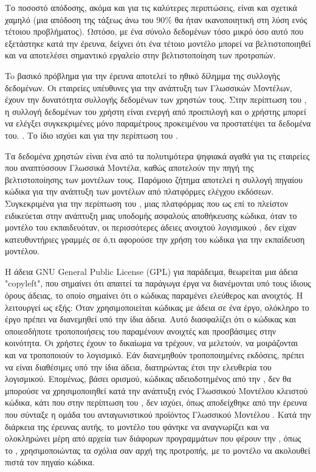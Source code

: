 Το ποσοστό απόδοσης, ακόμα και για τις καλύτερες
περιπτώσεις, είναι και σχετικά χαμηλό (μια απόδοση της τάξεως άνω του
90\% θα ήταν ικανοποιητική στη λύση ενός τέτοιου προβλήματος). Ωστόσο, με ένα
σύνολο δεδομένων τόσο μικρό όσο αυτό που εξετάστηκε κατά την έρευνα,
δείχνει ότι ένα τέτοιο μοντέλο μπορεί να βελτιστοποιηθεί και να
αποτελέσει σημαντικό εργαλείο στην βελτιστοποίηση των προτροπών.

To βασικό πρόβλημα για την έρευνα αποτελεί το ηθικό δίλημμα της
συλλογής δεδομένων. Οι εταιρείες υπέυθυνες για την ανάπτυξη των
Γλωσσικών Μοντέλων, έχουν την δυνατότητα συλλογής δεδομένων των
χρηστών τους. Στην περίπτωση του , η συλλογή
δεδομένων του χρήστη είναι ενεργή από προεπιλογή και ο χρήστης μπορεί
να ελέγξει συγκεκριμένες μόνο παραμέτρους προκειμένου να προστατέψει
τα δεδομένα του. \cite{ghcpdatacollection}. Το ίδιο ισχύει και για
την περίπτωση του  \cite{openaidatacollection}.

Tα δεδομένα χρηστών είναι ένα από τα πολυτιμότερα ψηφιακά αγαθά για
τις εταιρείες που αναπτύσσουν Γλωσσικά Μοντέλα, καθώς αποτελούν την
πηγή της βελτιστοποίησης των μοντέλων τους. Παρόμοιο ζήτημα αποτελεί
η συλλογή πηγαίου κώδικα για την ανάπτυξη των μοντέλων από πλατφόρμες
ελέγχου εκδόσεων. Συγκεκριμένα για την περίπτωση του ,
μιας πλατφόρμας που ως επί το πλείστον ειδικεύεται στην ανάπτυξη μιας
υποδομής ασφαλούς αποθήκευσης κώδικα, όταν το μοντέλο του  εκπαιδευόταν,
οι περισσότερες άδειες ανοιχτού λογισμικού
\cite{freesoftwaredef,ossdef,debian}, δεν είχαν κατευθυντήριες
γραμμές σε ό,τι αφορούσε την χρήση του κώδικα για την εκπαίδευση
μοντέλου.

Η άδεια \textlatin{GNU General Public License (GPL)} για παράδειμα,
θεωρείται μια άδεια \textlatin{"copyleft"}, που σημαίνει ότι απαιτεί
τα παράγωγα έργα να διανέμονται υπό τους ίδιους όρους άδειας, το
οποίο σημαίνει ότι ο κώδικας παραμένει ελεύθερος και ανοιχτός.
Η  λειτουργεί ως εξής: Όταν χρησιμοποιείται κώδικας με άδεια  σε
ένα έργο, ολόκληρο το έργο πρέπει να διανεμηθεί υπό την ίδια άδεια.
Αυτό διασφαλίζει ότι ο κώδικας και οποιεσδήποτε τροποποιήσεις του
παραμένουν ανοιχτές και προσβάσιμες στην κοινότητα. Οι χρήστες έχουν
το δικαίωμα να τρέχουν, να μελετούν, να μοιράζονται και να
τροποποιούν το λογισμικό. Εάν διανεμηθούν τροποποιημένες εκδόσεις,
πρέπει να είναι διαθέσιμες υπό την ίδια άδεια, διατηρώντας έτσι
την ελευθερία του λογισμικού. Eπομένως, βάσει ορισμού, κώδικας
αδειοδοτημένος από την , δεν θα μπορούσε να χρησιμοποιηθεί
κατά την ανάπτυξη ενός Γλωσσικού Μοντέλου κλειστού κώδικα, κάτι που
στην περίπτωση του , δεν ισχύει, όπως αποδείχθηκε
από την έρευνα που σύνταξε η ομάδα του ανταγωνιστικού προϊόντος
Γλωσσικού Μοντέλου  \cite{codeiumghcp,forbes2024codeium}.
Κατά την διάρκεια της έρευνας αυτής, το μοντέλο του  φάνηκε να
αναγνωρίζει και να ολοκληρώνει μέρη από αρχεία των διάφορων
προγραμμάτων που φέρουν την , όπως το ,
χρησιμοποιώντας τα σχόλια σαν αρχή της προτροπής, με το μοντέλο να
ακολουθεί πιστά τον πηγαίο κώδικα.

